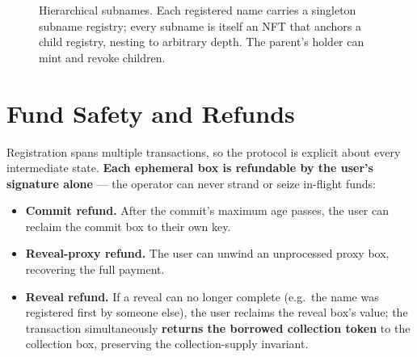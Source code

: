 \documentclass[11pt]{article}
\newcommand{\name}[1]{\texttt{\textasciitilde#1}}
\begin{document}
\begin{figure}[ht]
\centering
{}
\caption{Hierarchical subnames. Each registered name carries a singleton
subname registry; every subname is itself an NFT that anchors a child
registry, nesting to arbitrary depth. The parent's holder can mint and revoke
children.}
\label{fig:subnames}
\end{figure}

\section{Fund Safety and Refunds}
\label{sec:refunds}

Registration spans multiple transactions, so the protocol is explicit about
every intermediate state. \textbf{Each ephemeral box is refundable by the
user's signature alone} --- the operator can never strand or seize in-flight
funds:

\begin{itemize}
  \item \textbf{Commit refund.} After the commit's maximum age passes, the
        user can reclaim the commit box to their own key.
  \item \textbf{Reveal-proxy refund.} The user can unwind an unprocessed
        proxy box, recovering the full payment.
  \item \textbf{Reveal refund.} If a reveal can no longer complete (e.g.\ the
        name was registered first by someone else), the user reclaims the
        reveal box's value; the transaction simultaneously \textbf{returns
        the borrowed collection token} to the collection box, preserving the
        collection-supply invariant.
\end{itemize}
\end{document}
